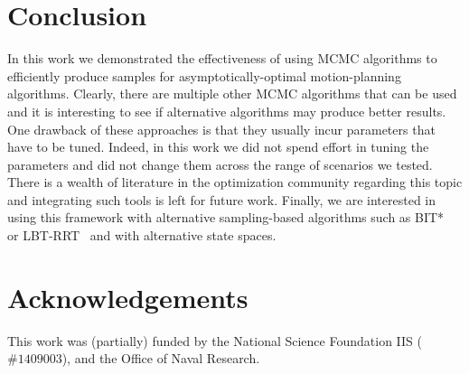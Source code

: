 \documentclass[letterpaper, 10 pt, conference]{ieeeconf}  %
\begin{document}
\section{Conclusion}
\label{sec:future}

In this work we demonstrated the effectiveness of using MCMC algorithms to 
efficiently produce samples for asymptotically-optimal motion-planning algorithms.
Clearly, there are multiple other MCMC algorithms that can be used and it is interesting to see if alternative algorithms may produce better results.
One drawback of these approaches is that they usually incur parameters that have to be tuned. Indeed, in this work we did not spend effort in tuning the parameters and did not change them across the range of scenarios we tested. 
There is a wealth of literature in the optimization community regarding this topic and integrating  such tools is left for future work.
Finally, we are interested in using this framework with alternative sampling-based algorithms such as BIT*~\cite{GSB15} or LBT-RRT~\cite{SH16} and with alternative state spaces.

\section{Acknowledgements}

This work was (partially) funded by the National Science Foundation IIS ($\#1409003$), and the Office of Naval Research.




%
\end{document}
